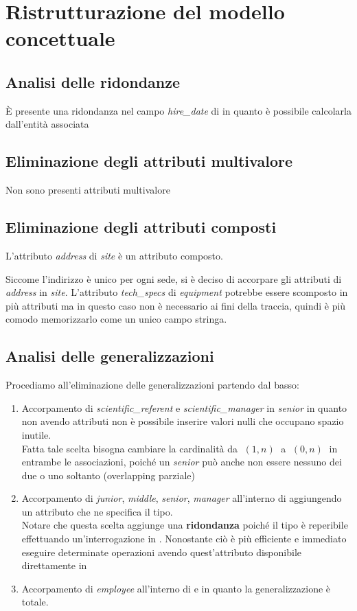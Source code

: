 \section{Ristrutturazione del modello concettuale}
\subsection{Analisi delle ridondanze}
È presente una ridondanza nel campo \textit{hire\_date} di \textit{\baseemp} in quanto è possibile calcolarla dall'entità associata \textit{\careerlog}
\subsection{Eliminazione degli attributi multivalore}
Non sono presenti attributi multivalore
\subsection{Eliminazione degli attributi composti}
L'attributo \textit{address} di \textit{site} è un attributo composto.

Siccome l'indirizzo è unico per ogni sede, si è deciso di accorpare gli attributi di \textit{address} in \textit{site}.\meskip
L'attributo \textit{tech\_specs} di \textit{equipment} potrebbe essere scomposto in più attributi ma in questo caso non è necessario ai fini della traccia, quindi è più comodo memorizzarlo come un unico campo stringa.

\subsection{Analisi delle generalizzazioni}
Procediamo all'eliminazione delle generalizzazioni partendo dal basso:
\begin{enumerate}
	\item Accorpamento di \textit{scientific\_referent} e \textit{scientific\_manager} in \textit{senior} in quanto non avendo attributi non è possibile inserire valori nulli che occupano spazio inutile.\\
	      Fatta tale scelta bisogna cambiare la cardinalità da $\;(1, n)\;$ a $\;(0, n)\;$ in entrambe le associazioni, poiché un \textit{senior} può anche non essere nessuno dei due o uno soltanto (overlapping parziale)
	\item Accorpamento di \textit{junior}, \textit{middle}, \textit{senior}, \textit{manager} all'interno di \textit{\baseemp} aggiungendo un attributo che ne specifica il tipo.\\
	      Notare che questa scelta aggiunge una \textbf{ridondanza} poiché il tipo è reperibile effettuando un'interrogazione in \textit{\careerlog}. Nonostante ciò è più efficiente e immediato eseguire determinate operazioni avendo quest'attributo disponibile direttamente in \textit{\baseemp}
	\item Accorpamento di \textit{employee} all'interno di \textit{\projectsalaried} e \textit{\baseemp} in quanto la generalizzazione è totale.
\end{enumerate}
